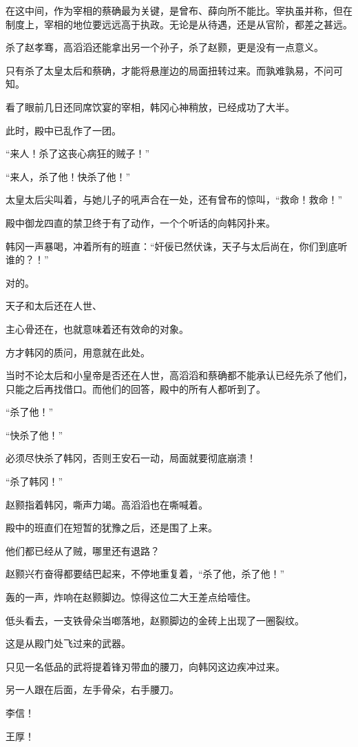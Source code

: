 在这中间，作为宰相的蔡确最为关键，是曾布、薛向所不能比。宰执虽并称，但在制度上，宰相的地位要远远高于执政。无论是从待遇，还是从官阶，都差之甚远。

杀了赵孝骞，高滔滔还能拿出另一个孙子，杀了赵颢，更是没有一点意义。

只有杀了太皇太后和蔡确，才能将悬崖边的局面扭转过来。而孰难孰易，不问可知。

看了眼前几日还同席饮宴的宰相，韩冈心神稍放，已经成功了大半。

此时，殿中已乱作了一团。

“来人！杀了这丧心病狂的贼子！”

“来人，杀了他！快杀了他！”

太皇太后尖叫着，与她儿子的吼声合在一处，还有曾布的惊叫，“救命！救命！”

殿中御龙四直的禁卫终于有了动作，一个个听话的向韩冈扑来。

韩冈一声暴喝，冲着所有的班直：“奸佞已然伏诛，天子与太后尚在，你们到底听谁的？！”

对的。

天子和太后还在人世、

主心骨还在，也就意味着还有效命的对象。

方才韩冈的质问，用意就在此处。

当时不论太后和小皇帝是否还在人世，高滔滔和蔡确都不能承认已经先杀了他们，只能之后再找借口。而他们的回答，殿中的所有人都听到了。

“杀了他！”

“快杀了他！”

必须尽快杀了韩冈，否则王安石一动，局面就要彻底崩溃！

“杀了韩冈！”

赵颢指着韩冈，嘶声力竭。高滔滔也在嘶喊着。

殿中的班直们在短暂的犹豫之后，还是围了上来。

他们都已经从了贼，哪里还有退路？

赵颢兴冇奋得都要结巴起来，不停地重复着，“杀了他，杀了他！”

轰的一声，炸响在赵颢脚边。惊得这位二大王差点给噎住。

低头看去，一支铁骨朵当啷落地，赵颢脚边的金砖上出现了一圈裂纹。

这是从殿门处飞过来的武器。

只见一名低品的武将提着锋刃带血的腰刀，向韩冈这边疾冲过来。

另一人跟在后面，左手骨朵，右手腰刀。

李信！

王厚！

